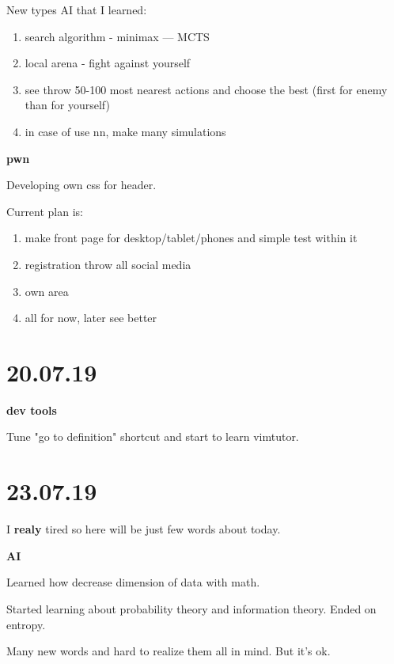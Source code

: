 \documentclass[12pt,a4paper,titlepage]{article}
\begin{document}
New types AI that I learned:
\begin{enumerate}
    \item search algorithm - minimax --- MCTS
    \item local arena - fight against yourself
    \item see throw 50-100 most nearest actions and choose the best (first for enemy than for yourself)
    \item in case of use nn, make many simulations
\end{enumerate}

\begin{center}
    \large \textbf{pwn}
\end{center}

Developing own css for header.

Current plan is:
\begin{enumerate}
    \item make front page for desktop/tablet/phones and simple test within it
    \item registration throw all social media
    \item own area
    \item all for now, later see better
\end{enumerate}

\newpage
\section{20.07.19}
\begin{center}
    \large \textbf{dev tools}
\end{center}

Tune "go to definition" shortcut and start to learn vimtutor.

\newpage
\section{23.07.19}

I \textbf{realy} tired so here will be just few words about today.
\begin{center}
    \large \textbf{AI}
\end{center}

Learned how decrease dimension of data with math.

Started learning about probability theory and information theory. Ended on entropy.

Many new words and hard to realize them all in mind. But it's ok.
\end{document}
